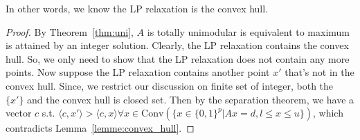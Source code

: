 \documentclass[11pt]{article}
\begin{document}
In other words, we know the LP relaxation is the convex hull.
\begin{proof}
By Theorem~\ref{thm:uni}, $ A$ is totally unimodular is equivalent to maximum is attained by an integer solution. Clearly, the LP relaxation contains the convex hull. So, we only need to show that the LP relaxation does not contain any more points. Now suppose the LP relaxation contains another point $x'$ that's not in the convex hull. Since, we restrict our discussion on finite set of integer, both the $\{x'\}$ and the convex hull is closed set. Then by the separation theorem, we have a vector $c$ s.t. $\langle c,x' \rangle >  \langle c,x \rangle \forall x \in \mathrm{Conv}(\{ x \in \{0,1\}^p |  Ax = d, l \leq x \leq u\}) $,  which contradicts Lemma~\ref{lemme:convex_hull}.
\end{proof}
\end{document}

